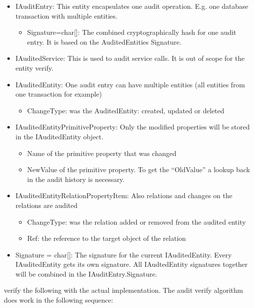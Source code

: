 \begin{itemize}
	\item IAuditEntry: This entity encapsulates one audit operation. E.g. one database transaction with multiple entities.
	\begin{itemize}
		\item Signature=char[]: The combined cryptographically hash for one audit entry. It is based on the AuditedEntities Signature.
	\end{itemize}
	\item IAuditedService: This is used to audit service calls. It is out of scope for the entity verify.
	\item IAuditedEntity: One audit entry can have multiple entities (all entities from one transaction for example)
	\begin{itemize}
		\item ChangeType: was the AuditedEntity: created, updated or deleted
	\end{itemize}
	\item IAuditedEntityPrimitiveProperty: Only the modified properties will be stored in the IAuditedEntity object.
	\begin{itemize}
		\item Name of the primitive property that was changed
		\item NewValue of the primitive property. To get the ``OldValue'' a lookup back in the audit history is necessary.
	\end{itemize}
	\item IAuditedEntityRelationPropertyItem: Also relations and changes on the relations are audited
	\begin{itemize}
		\item ChangeType: was the relation added or removed from the audited entity
		\item Ref: the reference to the target object of the relation
	\end{itemize}
	\item Signature = char[]: The signature for the current IAuditedEntity. Every IAuditedEntity gets its own signature. All IAudtedEntity signatures together will be combined in the IAuditEntry.Signature.
\end{itemize}
\TODO verify the following with the actual implementation.
The audit verify algorithm does work in the following sequence:
